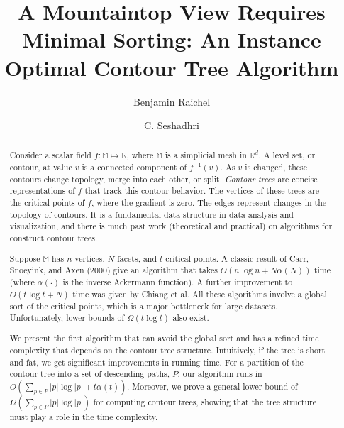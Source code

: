 \documentclass[11pt]{article}
\author{
  Benjamin Raichel
  \and
  C. Seshadhri
}
\title{A Mountaintop View Requires Minimal Sorting: \break An Instance Optimal Contour Tree Algorithm}
\date{}
\newcommand{\ignore}[1]{}
\theoremstyle{definition}
\newcommand{\MM}{\mathbb{M}}
\newcommand{\RR}{\mathbb{R}}
\begin{document}
\maketitle

\begin{abstract}
Consider a scalar field $f:\MM \mapsto \RR$, where $\MM$ is a simplicial mesh in $\RR^d$. 
A level set, or contour, at value $v$ is a connected component of $f^{-1}(v)$. 
As $v$ is changed, these contours change topology, merge into each other, or split.
\emph{Contour trees} are concise representations of $f$ that track this contour
behavior. The vertices of these trees are the critical points of $f$, where the gradient is zero.
The edges represent changes in the topology of contours.
It is a fundamental data structure in data analysis and visualization,
and there is much past work (theoretical and practical) on algorithms for construct contour trees.

Suppose $\MM$ has $n$ vertices, $N$ facets, and $t$ critical points.
A classic result of Carr, Snoeyink, and Axen (2000) give an algorithm that takes $O(n\log n + N\alpha(N))$ time
(where $\alpha(\cdot)$ is the inverse Ackermann function). A further improvement to $O(t\log t + N)$ time
was given by Chiang et al. All these algorithms involve a global sort of the critical points,
which is a major bottleneck for large datasets. Unfortunately, lower bounds of $\Omega(t\log t)$ also exist.

We present the first algorithm that can avoid the global sort and has a refined time complexity that
depends on the contour tree structure. Intuitively, if the tree is short and fat, we get significant improvements 
in running time. For a partition of the contour tree into a set of descending paths, $P$,
our algorithm runs in $O(\sum_{p\in P} |p|\log|p| + t\alpha(t))$. Moreover, we prove a general lower bound of
$\Omega(\sum_{p \in P} |p|\log |p|)$ for computing contour trees, showing
that the tree structure must play a role in the time complexity.


\ignore{
Moreover, we show there   
exists some partition $P'$ such that the running time of our algorithm is 
$O(\sum_{p\in P'} |p|\log|p| + N\alpha(N))$, where $N$ is the total complexity of the input manifold 

All previous contour tree algorithms involve a global sort 
of the heights of all points or critical vertices. Thereby, these algorithms always pay $\Omega(t \log t)$.
This is a major roadblock for efficiency, since sorting is the most expensive operation

}
\end{abstract}
\end{document}
